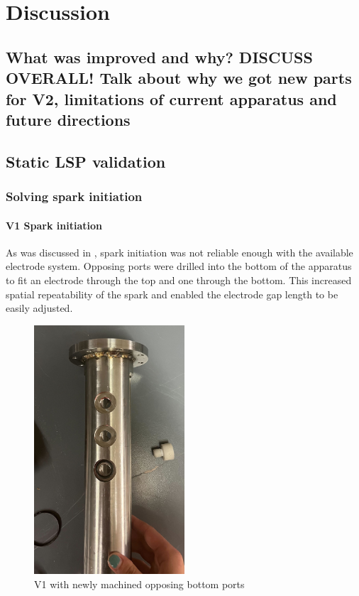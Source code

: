 \chapter{Discussion}

\section*{What was improved and why? DISCUSS OVERALL! Talk about why we got new parts for V2, limitations of current apparatus and future directions}

\section{Static LSP validation}

    \subsection{Solving spark initiation}

        \subsubsection{V1 Spark initiation}
            
             As was discussed in \textcite{duplayArgonLaserPlasmaThruster2024a}, spark initiation was not reliable enough with the available electrode system. Opposing ports were drilled into the bottom of the apparatus to fit an electrode through the top and one through the bottom. This increased spatial repeatability of the spark and enabled the electrode gap length to be easily adjusted.

            \begin{figure}[!ht]
                \centering
                \includegraphics[width=0.5\textwidth]{assets/5 discussion/Bottom ports machined.jpg}
                \caption{V1 with newly machined opposing bottom ports}
            \end{figure}

